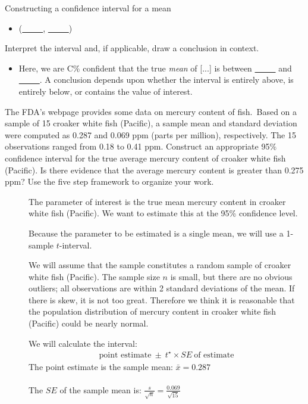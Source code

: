 \begin{onebox}{Constructing a confidence interval for a mean}
\begin{itemize}
\begin{itemize}
\end{itemize}
\item[] (\underline{\ \ \ \ \ }, \underline{\ \ \ \ \ })
\end{itemize}
 Interpret the interval and, if applicable, draw a conclusion in context. \vspace{-1mm}
\begin{itemize}
\item[] Here, we are C\%  confident that the true \emph{mean} of [...] is between \underline{\ \ \ \ \ } and  \underline{\ \ \ \ \ }.  A conclusion depends upon whether the interval is entirely above, is entirely below, or contains the value of interest. 
\end{itemize}\end{onebox}

\begin{examplewrap}
\begin{nexample}
{The FDA's webpage provides some data on mercury content of fish.\footnotemark\, Based on a sample of 15 croaker white fish (Pacific), a sample mean and standard deviation were computed as 0.287 and 0.069 ppm (parts per million), respectively. The 15 observations ranged from 0.18 to 0.41 ppm. Construct an appropriate 95\% confidence interval for the true average mercury content of croaker white fish (Pacific). Is there evidence that the average mercury content is greater than 0.275 ppm?  Use the five step framework to organize your work.  
}
\label{croakerWhiteFishPacificExerConditions}
\begin{description}
\item[] The parameter of interest is the true mean mercury content in croaker white fish (Pacific).  We want to estimate this at the 95\% confidence level.  
\item[] Because the parameter to be estimated is a single mean, we will use a 1-sample $t$-interval.
\item[] We will assume that the sample constitutes a random sample of croaker white fish (Pacific). The sample size $n$ is small, but there are no obvious outliers; all observations are within 2 standard deviations of the mean. If there is skew, it is not too great. Therefore we think it is reasonable that the population distribution of mercury content in croaker white fish (Pacific) could be nearly normal.  
\item[]  We will calculate the interval:
\begin{align*}
\text{point estimate}\ \pm\ t^{\star} \times SE\ \text{of estimate}
\end{align*}
The point estimate is the sample mean: $\bar{x}= 0.287$\\
\\
The $SE$ of the sample mean is: $ \frac{s}{\sqrt{n}} = \frac{0.069}{\sqrt{15}}$ \\


\end{description}
\end{nexample}
\end{examplewrap}
